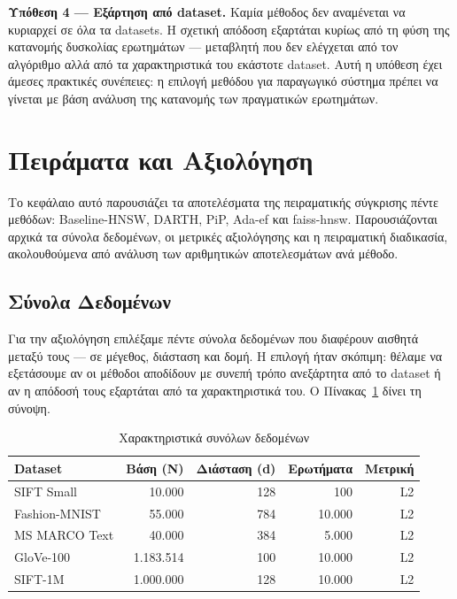 \documentclass[12pt,a4paper]{article}
\begin{document}
\textbf{Υπόθεση 4 — Εξάρτηση από dataset.}
Καμία μέθοδος δεν αναμένεται να κυριαρχεί σε όλα τα datasets. Η σχετική απόδοση εξαρτάται κυρίως από τη φύση της κατανομής δυσκολίας ερωτημάτων — μεταβλητή που δεν ελέγχεται από τον αλγόριθμο αλλά από τα χαρακτηριστικά του εκάστοτε dataset. Αυτή η υπόθεση έχει άμεσες πρακτικές συνέπειες: η επιλογή μεθόδου για παραγωγικό σύστημα πρέπει να γίνεται με βάση ανάλυση της κατανομής των πραγματικών ερωτημάτων.
\newpage
\section{Πειράματα και Αξιολόγηση}

Το κεφάλαιο αυτό παρουσιάζει τα αποτελέσματα της πειραματικής σύγκρισης πέντε μεθόδων: Baseline-HNSW, DARTH, PiP, Ada-ef και faiss-hnsw. Παρουσιάζονται αρχικά τα σύνολα δεδομένων, οι μετρικές αξιολόγησης και η πειραματική διαδικασία, ακολουθούμενα από ανάλυση των αριθμητικών αποτελεσμάτων ανά μέθοδο.

\subsection{Σύνολα Δεδομένων}

Για την αξιολόγηση επιλέξαμε πέντε σύνολα δεδομένων που διαφέρουν αισθητά μεταξύ τους --- σε μέγεθος, διάσταση και δομή. Η επιλογή ήταν σκόπιμη: θέλαμε να εξετάσουμε αν οι μέθοδοι αποδίδουν με συνεπή τρόπο ανεξάρτητα από το dataset ή αν η απόδοσή τους εξαρτάται από τα χαρακτηριστικά του. Ο Πίνακας~\ref{tab:datasets} δίνει τη σύνοψη.

\begin{table}[H]
\centering
\caption{Χαρακτηριστικά συνόλων δεδομένων}
\label{tab:datasets}
\begin{tabular}{lrrrr}
\toprule
\textbf{Dataset} & \textbf{Βάση (N)} & \textbf{Διάσταση (d)} & \textbf{Ερωτήματα} & \textbf{Μετρική} \\
\midrule
SIFT Small       & 10.000      & 128  & 100    & L2 \\
Fashion-MNIST    & 55.000      & 784  & 10.000 & L2 \\
MS MARCO Text    & 40.000      & 384  & 5.000  & L2 \\
GloVe-100        & 1.183.514   & 100  & 10.000 & L2 \\
SIFT-1M          & 1.000.000   & 128  & 10.000 & L2 \\
\bottomrule
\end{tabular}
\end{table}
\end{document}
